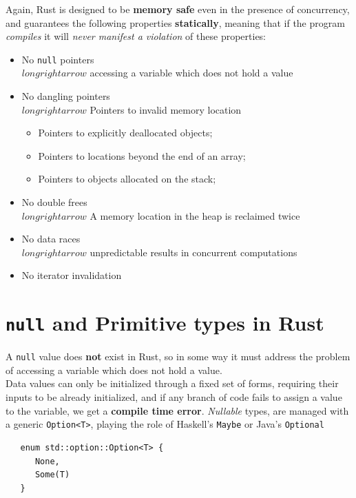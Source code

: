 Again, Rust is designed to be \textbf{memory safe} even in the presence
of concurrency, and guarantees the following properties \textbf{statically}, meaning that
if the program \textit{compiles} it will \textit{never manifest a violation} of these properties: 
\begin{itemize}
   \item No \texttt{null} pointers\\
   $longrightarrow$ accessing a variable which does not hold a value
   \item No dangling pointers\\
   $longrightarrow$ Pointers to invalid memory location
   \begin{itemize}
      \item Pointers to explicitly deallocated objects;
      \item Pointers to locations beyond the end of an array;
      \item Pointers to objects allocated on the stack;
   \end{itemize}
   \item No double frees\\
   $longrightarrow$ A memory location in the heap is reclaimed twice
   \item No data races\\
   $longrightarrow$ unpredictable results in concurrent computations
   \item No iterator invalidation
\end{itemize}

\section{\texttt{null} and Primitive types in Rust}
A \texttt{null} value does \textbf{not} exist in Rust, so in some way it must address the problem of accessing a variable which does not hold a value.\\
Data values can only be initialized through a fixed set of
forms, requiring their inputs to be already initialized, and if 
any branch of code fails to assign a
value to the variable, we get a \textbf{compile time error}.
\lstset{language=Rust}
\textit{Nullable} types, are managed with a generic \lstinline|Option<T>|, playing
the role of Haskell’s \texttt{Maybe} or Java’s \texttt{Optional}
\begin{lstlisting}
   enum std::option::Option<T> {
      None,
      Some(T)
   }
\end{lstlisting}

